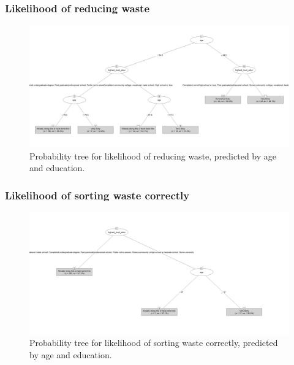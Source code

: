 \documentclass[
  letterpaper,
  DIV=11,
  numbers=noendperiod]{scrartcl}
\begin{document}
\subsubsection{Likelihood of reducing
waste}\label{likelihood-of-reducing-waste}

\begin{figure}[H]

{\centering \includegraphics[width=10.67in,height=\textheight]{../data/04-model_data/reduce_waste_tree.png}

}

\caption{Probability tree for likelihood of reducing waste, predicted by
age and education.}

\end{figure}%

\subsubsection{Likelihood of sorting waste
correctly}\label{likelihood-of-sorting-waste-correctly}

\begin{figure}[H]

{\centering \includegraphics[width=10.67in,height=\textheight]{../data/04-model_data/sort_waste_tree.png}

}

\caption{Probability tree for likelihood of sorting waste correctly,
predicted by age and education.}

\end{figure}%
\end{document}
